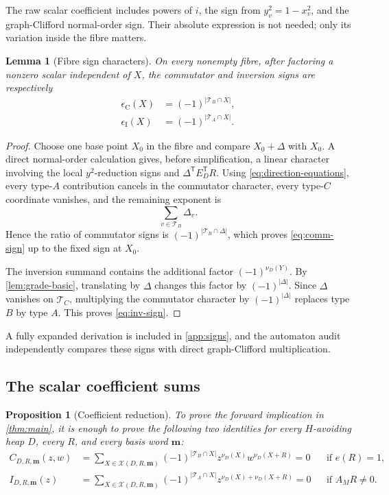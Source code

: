 \documentclass[10pt,letterpaper]{article}
\newtheorem{proposition}[theorem]{Proposition}
\newtheorem{lemma}[theorem]{Lemma}
\newcommand{\Xfib}{\mathcal X}
\begin{document}
The raw scalar coefficient includes powers of \(i\), the sign from \(y_v^2=1-x_v^2\), and the graph-Clifford normal-order sign.  Their absolute expression is not needed; only its variation inside the fibre matters.

\begin{lemma}[Fibre sign characters]\label{lem:sign-characters}
On every nonempty fibre, after factoring a nonzero scalar independent of \(X\), the commutator and inversion signs are respectively
\begin{align}
 \epsilon_{\mathrm C}(X)&=(-1)^{|\mathcal T_B\cap X|},\label{eq:comm-sign}\\
 \epsilon_{\mathrm I}(X)&=(-1)^{|\mathcal T_A\cap X|}.
\label{eq:inv-sign}
\end{align}
\end{lemma}

\begin{proof}
Choose one base point \(X_0\) in the fibre and compare \(X_0+\Delta\) with \(X_0\).  A direct normal-order calculation gives, before simplification, a linear character involving the local \(y^2\)-reduction signs and \(\Delta^{\mathsf T}E_D^{\mathsf T}R\).  Using \eqref{eq:direction-equations}, every type-\(A\) contribution cancels in the commutator character, every type-\(C\) coordinate vanishes, and the remaining exponent is
\[
 \sum_{v\in\mathcal T_B}\Delta_v.
\]
Hence the ratio of commutator signs is \((-1)^{|\mathcal T_B\cap\Delta|}\), which proves \eqref{eq:comm-sign} up to the fixed sign at \(X_0\).

The inversion summand contains the additional factor \((-1)^{\nu_D(Y)}\).  By \cref{lem:grade-basic}, translating by \(\Delta\) changes this factor by \((-1)^{|\Delta|}\).  Since \(\Delta\) vanishes on \(\mathcal T_C\), multiplying the commutator character by \((-1)^{|\Delta|}\) replaces type \(B\) by type \(A\).  This proves \eqref{eq:inv-sign}.
\end{proof}

A fully expanded derivation is included in \cref{app:signs}, and the automaton audit independently compares these signs with direct graph-Clifford multiplication.

\subsection{The scalar coefficient sums}

\begin{proposition}[Coefficient reduction]\label{prop:coefficient-reduction}
To prove the forward implication in \cref{thm:main}, it is enough to prove the following two identities for every \(H\)-avoiding heap \(D\), every \(R\), and every basis word \(\bm m\):
\begin{align}
 C_{D,R,\bm m}(z,w)
 &=\sum_{X\in\Xfib(D,R,\bm m)}
 (-1)^{|\mathcal T_B\cap X|}
 z^{\nu_D(X)}w^{\nu_D(X+R)}=0
 &&\text{if }e(R)=1,
 \label{eq:C-sum}\\
 I_{D,R,\bm m}(z)
 &=\sum_{X\in\Xfib(D,R,\bm m)}
 (-1)^{|\mathcal T_A\cap X|}
 z^{\nu_D(X)+\nu_D(X+R)}=0
 &&\text{if }A_MR\ne0.
 \label{eq:I-sum}
\end{align}
\end{proposition}
\end{document}

